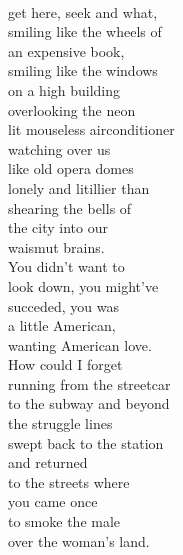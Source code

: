 \documentclass[smalldemyvopaper,11pt,twoside,onecolumn,openright,extrafontsizes]{memoir}
\begin{document}
\\get here, seek and what,
\\smiling like the wheels of
\\an expensive book,
\\smiling like the windows
\\on a high building
\\overlooking the neon
\\lit mouseless airconditioner
\\watching over us
\\like old opera domes
\\lonely and litillier than
\\shearing the bells of
\\the city into our
\\waismut brains.
\\You didn't want to
\\look down, you might've
\\succeded, you was
\\a little American,
\\wanting American love.
\\How could I forget
\\running from the streetcar
\\to the subway and beyond
\\the struggle lines
\\swept back to the station
\\and returned
\\to the streets where
\\you came once
\\to smoke the male
\\over the woman's land.
\end{document}
